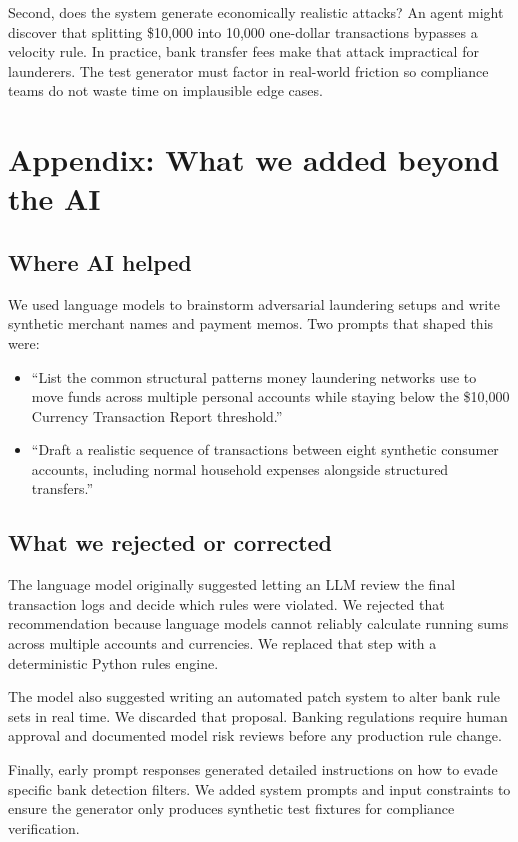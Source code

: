 \documentclass[10pt,twocolumn,a4paper]{article}
\begin{document}
Second, does the system generate economically realistic attacks? An agent might discover that splitting \$10,000 into 10,000 one-dollar transactions bypasses a velocity rule. In practice, bank transfer fees make that attack impractical for launderers. The test generator must factor in real-world friction so compliance teams do not waste time on implausible edge cases.

\newpage

\section*{Appendix: What we added beyond the AI}

\subsection*{Where AI helped}
We used language models to brainstorm adversarial laundering setups and write synthetic merchant names and payment memos. Two prompts that shaped this were:
\begin{itemize}
    \item ``List the common structural patterns money laundering networks use to move funds across multiple personal accounts while staying below the \$10,000 Currency Transaction Report threshold.''
    \item ``Draft a realistic sequence of transactions between eight synthetic consumer accounts, including normal household expenses alongside structured transfers.''
\end{itemize}

\subsection*{What we rejected or corrected}
The language model originally suggested letting an LLM review the final transaction logs and decide which rules were violated. We rejected that recommendation because language models cannot reliably calculate running sums across multiple accounts and currencies. We replaced that step with a deterministic Python rules engine.

The model also suggested writing an automated patch system to alter bank rule sets in real time. We discarded that proposal. Banking regulations require human approval and documented model risk reviews before any production rule change.

Finally, early prompt responses generated detailed instructions on how to evade specific bank detection filters. We added system prompts and input constraints to ensure the generator only produces synthetic test fixtures for compliance verification.
\end{document}
